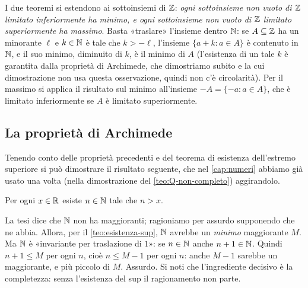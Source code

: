 \begin{osservazione}
I due teoremi si estendono ai sottoinsiemi di $\mathbb{Z}$: \emph{ogni sottoinsieme non vuoto di
$\mathbb{Z}$ limitato inferiormente ha minimo, e ogni sottoinsieme non vuoto di $\mathbb{Z}$ limitato
superiormente ha massimo}. Basta «traslare» l'insieme dentro $\mathbb{N}$: se $A\subseteq\mathbb{Z}$ ha un
minorante $\ell$ e $k\in\mathbb{N}$ è tale che $k>-\ell$, l'insieme $\{a+k : a\in A\}$ è contenuto
in $\mathbb{N}$, e il suo minimo, diminuito di $k$, è il minimo di $A$ (l'esistenza di un tale $k$
è garantita dalla proprietà di Archimede, che dimostriamo subito e la cui dimostrazione
non usa questa osservazione, quindi non c'è circolarità). Per il massimo si applica il
risultato sul minimo all'insieme $-A=\{-a : a\in A\}$, che è limitato inferiormente se
$A$ è limitato superiormente.
\end{osservazione}

\subsection{La proprietà di Archimede}

Tenendo conto delle proprietà precedenti e del teorema di esistenza dell'estremo
superiore si può dimostrare il risultato seguente, che nel \cref{cap:numeri} abbiamo già
usato una volta (nella dimostrazione del \cref{teo:Q-non-completo}) aggirandolo.

\begin{teorema}\label{teo:archimede}
Per ogni $x\in\mathbb{R}$ esiste $n\in\mathbb{N}$ tale che $n>x$.
\end{teorema}

\begin{schema}
\end{schema}

\begin{strategia}
La tesi dice che $\mathbb{N}$ non ha maggioranti; ragioniamo per assurdo supponendo che ne abbia.
Allora, per il \cref{teo:esistenza-sup}, $\mathbb{N}$ avrebbe un \emph{minimo} maggiorante $M$.
Ma $\mathbb{N}$ è «invariante per traslazione di $1$»: se $n\in\mathbb{N}$ anche $n+1\in\mathbb{N}$. Quindi
$n+1\le M$ per ogni $n$, cioè $n\le M-1$ per ogni $n$: anche $M-1$ sarebbe un
maggiorante, e più piccolo di $M$. Assurdo. Si noti che l'ingrediente decisivo è la
completezza: senza l'esistenza del sup il ragionamento non parte.
\end{strategia}


